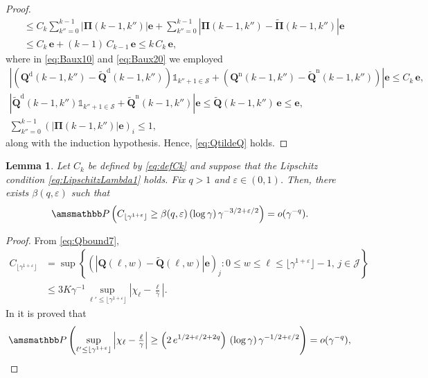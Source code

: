 \documentclass[11pt,leqno]{amsart}
\numberwithin{table}{section}
\numberwithin{figure}{section}
\numberwithin{equation}{section}
\newcommand{\1}{{\mathds{1}}}
\newcommand{\0}{\mat{0}}
\renewcommand{\P }{{\amsmathbb P}}
\newtheorem{lemma}{Lemma}[section]
\newcommand{\tld}[1]{\widetilde{#1}}
\begin{document}
{\begin{proof}
\begin{align}
& \le C_{k}\sum_{k''=0}^{k-1}\left|{\bm{\Pi}}(k-1,k'')\right|\bm{e} + \sum_{k''=0}^{k-1}\left| {\bm{\Pi}}(k-1,k'')-\tld{\bm{\Pi}}(k-1,k'')\right|\bm{e} \label{eq:Baux10} \\
& \le C_{k}\,\bm{e} + (k-1)\,C_{k-1}\,\bm{e}\le k\,C_k\,\bm{e},\label{eq:Baux20}
\end{align}
where in \eqref{eq:Baux10} and \eqref{eq:Baux20} we employed
\[
\begin{gathered}
 \left| ({\bm{Q}}^{\mathrm{d}}(k-1,k'')-\tld{\bm{Q}}^{\mathrm{d}}(k-1,k''))\mathds{1}_{k''+1\in \mathcal{S}} + ({\bm{Q}}^{\mathrm{n}}(k-1,k'')-\tld{\bm{Q}}^{\mathrm{n}}(k-1,k''))\right|\bm{e}\le C_{k}\,\bm{e},\\ 
\left|\tld{\bm{Q}}^{\mathrm{d}}(k-1,k'')\mathds{1}_{k''+1\in \mathcal{S}} + \tld{\bm{Q}}^{\mathrm{n}}(k-1,k'')\right|\bm{e}\le \tld{\bm{Q}}(k-1,k'')\,\bm{e} \le \bm{e},\\
\sum_{k''=0}^{k-1}(\left|{\bm{\Pi}}(k-1,k'')\right|\bm{e})_i \le 1,
\end{gathered}
\]
along with the induction hypothesis. Hence, \eqref{eq:QtildeQ} holds.
\end{proof}
\begin{lemma}\label{lem:boundCk} Let $C_{k}$ be defined by \eqref{eq:defCk} and suppose that the Lipschitz condition \eqref{eq:LipschitzLambda1} holds. Fix $q>1$ and $\varepsilon\in(0,1)$. Then, there exists $\beta(q,\varepsilon)$ such that
\begin{align}
\P\left(C_{\lfloor \gamma^{1+\varepsilon} \rfloor} \ge \beta(q,\varepsilon)\,(\log \gamma)\,\gamma^{-3/2+\varepsilon/2}\right)=o(\gamma^{-q}).\label{eq:Cgammaepsilon0}
\end{align}
\end{lemma}
\begin{proof}
From \eqref{eq:Qbound7},
{
\begin{align}
C_{\lfloor \gamma^{1+\varepsilon} \rfloor} & = \sup\left\{\left(\left|\bm{Q}(\ell,w)-\tld{\bm{Q}}(\ell,w)\right|\bm{e}\right)_j: 0\le w\le \ell\le \lfloor\gamma^{1+\varepsilon} \rfloor-1,\,j\in\mathcal{J}\right\}\nonumber\\
&\le 3K \gamma^{-1} \sup_{\ell'\le {\lfloor \gamma^{1+\varepsilon} \rfloor}}\left|\chi_{\ell}-\tfrac{\ell}{\gamma}\right|.\label{eq:Cgammaepsilon1}
\end{align}
}
In \cite[Lemma 1, Eq (17)]{bladt_peralta} it is proved that
\begin{align}
\P\left(\sup_{\ell'\le {\lfloor \gamma^{1+\varepsilon} \rfloor}}\left|\chi_{\ell}-\tfrac{\ell}{\gamma}\right| \ge \left(2\,e^{1/2+\varepsilon/2+2q}\right)\,(\log \gamma)\,\gamma^{-1/2+\varepsilon/2}\right)=o(\gamma^{-q}),\label{eq:grid-conv1}

\end{align}
\end{proof}}
\end{document}
